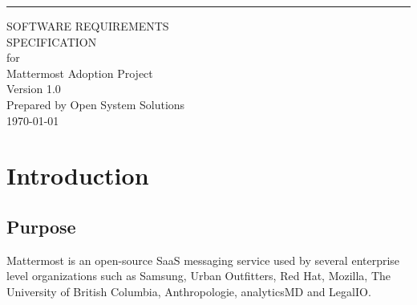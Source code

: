\documentclass{scrreprt}
\date{}
\def\myversion{1.0 }
\begin{document}
\begin{flushright}
    \rule{16cm}{5pt}\vskip1cm
    \begin{bfseries}
        \Huge{SOFTWARE REQUIREMENTS\\ SPECIFICATION}\\
        \vspace{1.9cm}
        for\\
        \vspace{1.9cm}
        Mattermost Adoption Project\\
        \vspace{1.9cm}
        \LARGE{Version \myversion}\\
        \vspace{1.9cm}
        Prepared by Open System Solutions\\
        \vspace{1.9cm}
        \today\\
    \end{bfseries}
\end{flushright}

\tableofcontents


%

\chapter{Introduction}

\section{Purpose}
Mattermost is an open-source SaaS messaging service used
by several enterprise level organizations such as Samsung, Urban Outfitters,
Red Hat, Mozilla, The University of British Columbia, Anthropologie, analyticsMD
and LegalIO.\\
\end{document}
